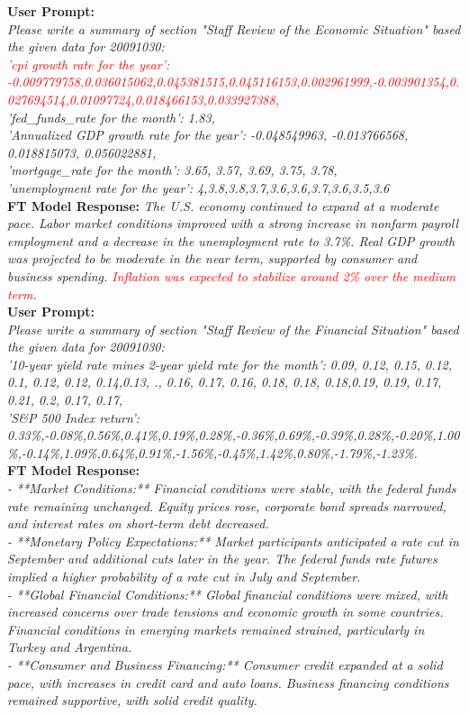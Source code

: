 \textbf{User Prompt:}\\
{\footnotesize
\textit{
Please write a summary of section "Staff Review of the Economic Situation" based the given data for 20091030: \\
\textcolor{red}{'cpi growth rate for the year': -0.009779758,0.036015062,0.045381515,0.045116153,0.002961999,-0.003901354,0.027694514,0.01097724,0.018466153,0.033927388,} \\
'fed\_funds\_rate for the month': 1.83, \\
'Annualized GDP growth rate for the year': -0.048549963, -0.013766568, 0.018815073, 0.056022881, \\
'mortgage\_rate for the month': 3.65, 3.57, 3.69, 3.75, 3.78, \\
'unemployment rate for the year': 4,3.8,3.8,3.7,3.6,3.6,3.7,3.6,3.5,3.6}
}\\
\textbf{FT Model Response:}
{\footnotesize
\textit{
    The U.S. economy continued to expand at a moderate pace. Labor market conditions improved with a strong increase in nonfarm payroll employment and a decrease in the unemployment rate to 3.7\%. Real GDP growth was projected to be moderate in the near term, supported by consumer and business spending. \textcolor{red}{Inflation was expected to stabilize around 2\% over the medium term}.
}}
~\\
\textbf{User Prompt:}\\
{\footnotesize
\textit{
Please write a summary of section "Staff Review of the Financial Situation" based the given data for 20091030: \\
'10-year yield rate mines 2-year yield rate for the month': 0.09, 0.12, 0.15, 0.12, 0.1, 0.12, 0.12, 0.14,0.13, ., 0.16, 0.17, 0.16, 0.18, 0.18, 0.18,0.19, 0.19, 0.17, 0.21, 0.2, 0.17, 0.17, \\
'S\&P 500 Index return': 0.33\%,-0.08\%,0.56\%,0.41\%,0.19\%,0.28\%,-0.36\%,0.69\%,-0.39\%,0.28\%,-0.20\%,1.00\%,-0.14\%,1.09\%,0.64\%,0.91\%,-1.56\%,-0.45\%,1.42\%,0.80\%,-1.79\%,-1.23\%.}
}\\
\textbf{FT Model Response:}\\
{\footnotesize
\textit{
    - **Market Conditions:** Financial conditions were stable, with the federal funds rate remaining unchanged. Equity prices rose, corporate bond spreads narrowed, and interest rates on short-term debt decreased. \\
    - **Monetary Policy Expectations:** Market participants anticipated a rate cut in September and additional cuts later in the year. The federal funds rate futures implied a higher probability of a rate cut in July and September. \\
    - **Global Financial Conditions:** Global financial conditions were mixed, with increased concerns over trade tensions and economic growth in some countries. Financial conditions in emerging markets remained strained, particularly in Turkey and Argentina. \\
    - **Consumer and Business Financing:** Consumer credit expanded at a solid pace, with increases in credit card and auto loans. Business financing conditions remained supportive, with solid credit quality.
}}\\
